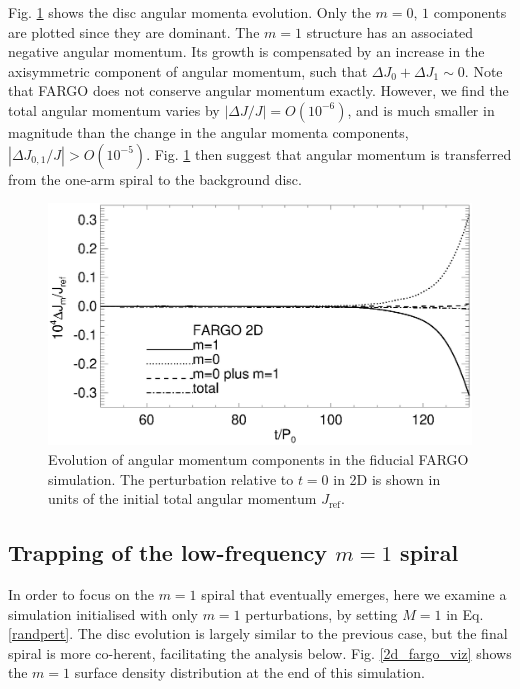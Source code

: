 Fig. \ref{2d_angmom} shows the disc angular momenta
evolution. Only the $m=0,\,1$ components are 
plotted since they are dominant. The $m=1$ structure has
an associated negative angular momentum.   
Its growth is compensated by an increase in the axisymmetric
component of angular momentum, such that $\Delta J_0 + \Delta
J_1 \sim 0$. Note that FARGO does not conserve angular momentum
exactly. However, we find the total angular momentum varies by 
$|\Delta J/J|= O(10^{-6})$, and is much smaller in magnitude than the
change in the angular momenta components, $|\Delta J_{0,1}/J|>
O(10^{-5})$. Fig. \ref{2d_angmom} then suggest that angular momentum
is transferred from the one-arm spiral to the background disc.    

\begin{figure}
  \includegraphics[width=\linewidth]{figures/nonaxi_evol_ang_fargo}
  \caption{Evolution of angular momentum components in the fiducial
    FARGO simulation. The perturbation
    relative to $t=0$ in 2D is shown in units of the
    initial total angular momentum $J_\mathrm{ref}$.\label{2d_angmom}} 
\end{figure}   

\subsection{Trapping of the low-frequency $m=1$ spiral}
In order to focus on the $m=1$ spiral that eventually emerges, here 
we examine a simulation initialised with only $m=1$
perturbations, by setting $M=1$ in Eq. \ref{randpert}. The disc
evolution is largely similar to the previous case, but the final spiral is
more co-herent, facilitating the analysis below. 
Fig. \ref{2d_fargo_viz} shows the $m=1$ surface density
distribution at the end of this simulation.  


